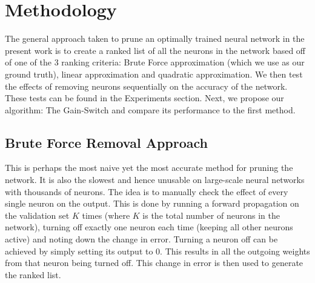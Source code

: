 \section{Methodology}
The general approach taken to prune an optimally trained neural network in the present work is to create a ranked list of all the neurons in the network based off of one of the 3 ranking criteria: Brute Force approximation (which we use as our ground truth), linear approximation and quadratic approximation. We then test the effects of removing neurons sequentially on the accuracy of the network. These tests can be found in the Experiments section. Next, we propose our algorithm: The Gain-Switch and compare its performance to the first method.

\subsection{Brute Force Removal Approach}
This is perhaps the most naive yet the most accurate method for pruning the network. It is also the slowest and hence unusable on large-scale neural networks with thousands of neurons. The idea is to manually check the effect of every single neuron on the output. This is done by running a forward propagation on the validation set $K$ times (where $K$ is the total number of neurons in the network), turning off exactly one neuron each time (keeping all other neurons active) and noting down the change in error. Turning a neuron off can be achieved by simply setting its output to 0. This results in all the outgoing weights from that neuron being turned off. This change in error is then used to generate the ranked list. 





